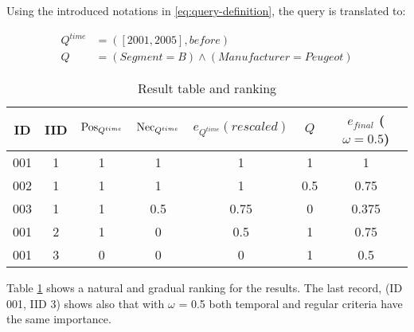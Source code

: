 Using the introduced notations in \eqref{eq:query-definition}, the query is translated to: %

%
%
%


\begin{align}
Q^{time} & = \left(\left[ 2001, 2005 \right], before\right) \\
Q & = \left(Segment =  B\right) \wedge \left(Manufacturer = Peugeot\right)
\end{align}


\begin{table}[ht]
\caption{Result table and ranking}
\centering
\begin{tabular}{c c c c c c c}
\hline
ID & IID &  $\operatorname{Pos}_{Q^{time}}$ & $\operatorname{Nec}_{Q^{time}}$ & $e_{Q^{time}} (rescaled)$ & $Q$ & $e_{final}$ ($\omega=0.5$) \\ [0.5ex]
\hline
001 & 1 & 1 &  1 & 1 & 1 & 1 \\
002 & 1 & 1 & 1 & 1 & 0.5 & 0.75 \\
003 & 1 & 1 & 0.5 & 0.75 &0 & 0.375\\
001 & 2 & 1 & 0 & 0.5 &1 & 0.75 \\
001 & 3 & 0 & 0 & 0 &1 & 0.5\\
\hline
\end{tabular}
\label{tb:results}
\end{table}


Table \ref{tb:results} shows a natural and gradual ranking for the results. The last record, (ID 001, IID 3) shows also that with $\omega$ = 0.5 both temporal and regular criteria have the same importance.%


